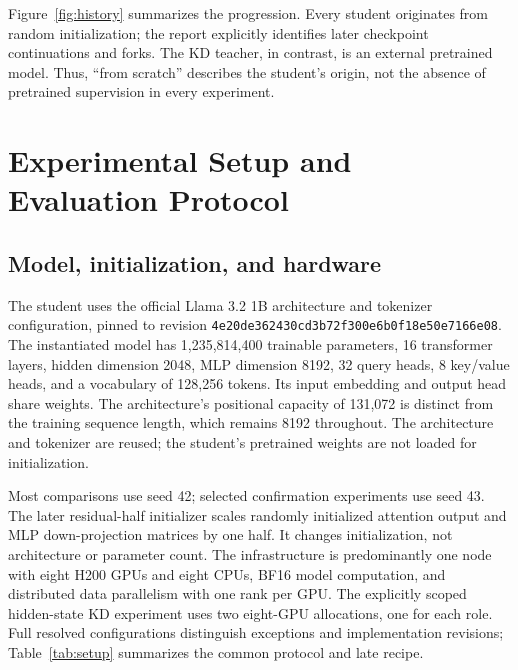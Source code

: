 Figure~\ref{fig:history} summarizes the progression. Every student originates from random initialization; the report explicitly identifies later checkpoint continuations and forks. The KD teacher, in contrast, is an external pretrained model. Thus, ``from scratch'' describes the student's origin, not the absence of pretrained supervision in every experiment.


\section{Experimental Setup and Evaluation Protocol}
\label{sec:setup}

\subsection{Model, initialization, and hardware}

The student uses the official Llama 3.2 1B architecture and tokenizer configuration, pinned to revision \texttt{4e20de362430cd3b72f300e6b0f18e50e7166e08}. The instantiated model has 1,235,814,400 trainable parameters, 16 transformer layers, hidden dimension 2048, MLP dimension 8192, 32 query heads, 8 key/value heads, and a vocabulary of 128,256 tokens. Its input embedding and output head share weights. The architecture's positional capacity of 131,072 is distinct from the training sequence length, which remains 8192 throughout. The architecture and tokenizer are reused; the student's pretrained weights are not loaded for initialization.

Most comparisons use seed 42; selected confirmation experiments use seed 43. The later residual-half initializer scales randomly initialized attention output and MLP down-projection matrices by one half. It changes initialization, not architecture or parameter count. The infrastructure is predominantly one node with eight H200 GPUs and eight CPUs, BF16 model computation, and distributed data parallelism with one rank per GPU. The explicitly scoped hidden-state KD experiment uses two eight-GPU allocations, one for each role. Full resolved configurations distinguish exceptions and implementation revisions; Table~\ref{tab:setup} summarizes the common protocol and late recipe.

